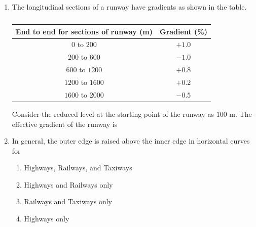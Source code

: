 \documentclass[journal,12pt,onecolumn]{article}
\theoremstyle{remark}
\begin{document}
\begin{enumerate}
    \item The longitudinal sections of a runway have gradients as shown in the table.
    \begin{table}[H]
        \centering
        \begin{tabular}{|c|c|}
        \hline
        \textbf{End to end for sections of runway (m)} & \textbf{Gradient (\%)} \\ \hline
        $0$ to $200$ & $+1.0$ \\
        $200$ to $600$ & $-1.0$ \\
        $600$ to $1200$ & $+0.8$ \\
        $1200$ to $1600$ & $+0.2$ \\
        $1600$ to $2000$ & $-0.5$ \\ \hline
        \end{tabular}
        \caption{}
        \label{tab:q27}
    \end{table}
    Consider the reduced level  at the starting point of the runway as $100$ m.
    The effective gradient of the runway is
    
    \hfill{}
    \begin{enumerate}
    \end{enumerate}
    
    \item In general, the outer edge is raised above the inner edge in horizontal curves for
    
    \hfill{}
    \begin{enumerate}
        \item Highways, Railways, and Taxiways
        \item Highways and Railways only
        \item Railways and Taxiways only
        \item Highways only
    \end{enumerate}
    

\end{enumerate}
\end{document}
